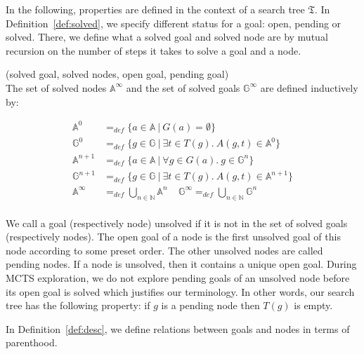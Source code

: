 \documentclass[runningheads,a4paper,draft]{svjour3}
\begin{document}
In the following, properties are defined in the context of a
search tree $\mathfrak{T}$. In Definition~\ref{def:solved}, we specify
different status for a goal: open, pending or solved. There, we define
what a solved goal and solved node are by mutual recursion on the number of
steps it takes to solve a goal and a node.
\begin{definition}\label{def:solved}(solved goal, solved nodes, open goal,
pending goal)\\
The set of solved nodes $\mathbb{A}^\infty$ and
the set of solved goals $\mathbb{G}^\infty$ are defined inductively by:

\begin{align*}
\mathbb{A}^{0} &=_{def}
\lbrace a \in \mathbb{A}\ |\ G(a) = \emptyset \rbrace \\
\mathbb{G}^{0} &=_{def} \lbrace g \in \mathbb{G}\ |\
\exists t \in T(g).\ A(g,t) \in \mathbb{A}^{0} \rbrace\\
\mathbb{A}^{n+1} &=_{def} \lbrace a \in \mathbb{A}\ |\
\forall g \in G(a).\ g \in \mathbb{G}^{n} \rbrace\\
\mathbb{G}^{n+1} &=_{def} \lbrace g \in \mathbb{G}\ |\
\exists t \in T(g).\ A(g,t) \in \mathbb{A}^{n+1} \rbrace \\
\mathbb{A}^\infty &=_{def} \bigcup_{n \in \mathbb{N}} \mathbb{A}^n \ \ \ \ \
\mathbb{G}^\infty =_{def} \bigcup_{n \in \mathbb{N}} \mathbb{G}^n\\
\end{align*}

We call a goal (respectively node) unsolved if it is not in the set of solved
goals (respectively nodes).
The open goal of a node is the first unsolved goal of this node according to
some preset order. The other unsolved nodes are called pending nodes.
If a node is unsolved, then it contains a unique open goal.
During MCTS exploration, we do not explore pending goals of an unsolved node
before its open goal is solved which justifies our terminology. In other words,
our search tree has the following property: if $g$ is a pending node then
$T(g)$ is empty.

\end{definition}


In Definition~\ref{def:desc}, we define relations between goals
and nodes in terms of parenthood.
\end{document}
